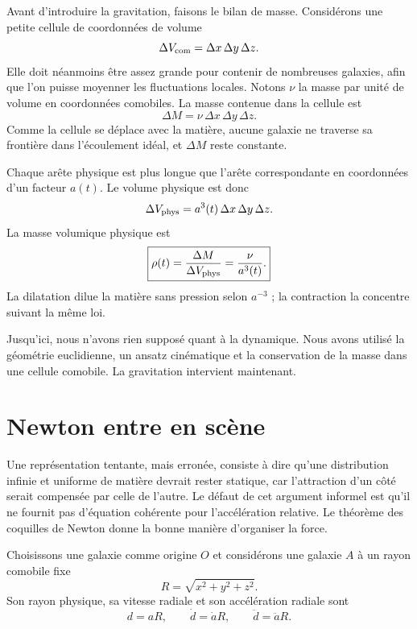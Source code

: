 Avant d’introduire la gravitation, faisons le bilan de masse. Considérons une petite cellule de coordonnées de volume
\begin{equation}
\Delta V_{\rm com}=\Delta x\,\Delta y\,\Delta z.
\end{equation}
Elle doit néanmoins être assez grande pour contenir de nombreuses galaxies, afin que l’on puisse moyenner les fluctuations locales. Notons \(\nu\) la masse par unité de volume en coordonnées comobiles. La masse contenue dans la cellule est
\begin{equation}
\Delta M=\nu\,\Delta x\,\Delta y\,\Delta z.
\label{eq:c01-comoving-mass}
\end{equation}
Comme la cellule se déplace avec la matière, aucune galaxie ne traverse sa frontière dans l’écoulement idéal, et \(\Delta M\) reste constante.

Chaque arête physique est plus longue que l’arête correspondante en coordonnées d’un facteur \(a(t)\). Le volume physique est donc
\begin{equation}
\Delta V_{\rm phys}=a^3(t)\,\Delta x\,\Delta y\,\Delta z.
\end{equation}
La masse volumique physique est
\begin{equation}
\boxed{\rho(t)=\frac{\Delta M}{\Delta V_{\rm phys}}=\frac{\nu}{a^3(t)}.}
\label{eq:c01-density-dilution}
\end{equation}
La dilatation dilue la matière sans pression selon \(a^{-3}\) ; la contraction la concentre suivant la même loi.

Jusqu’ici, nous n’avons rien supposé quant à la dynamique. Nous avons utilisé la géométrie euclidienne, un ansatz cinématique et la conservation de la masse dans une cellule comobile. La gravitation intervient maintenant.

\section{Newton entre en scène}

Une représentation tentante, mais erronée, consiste à dire qu’une distribution infinie et uniforme de matière devrait rester statique, car l’attraction d’un côté serait compensée par celle de l’autre. Le défaut de cet argument informel est qu’il ne fournit pas d’équation cohérente pour l’accélération relative. Le théorème des coquilles de Newton donne la bonne manière d’organiser la force.

Choisissons une galaxie comme origine \(O\) et considérons une galaxie \(A\) à un rayon comobile fixe
\begin{equation}
R=\sqrt{x^2+y^2+z^2}.
\end{equation}
Son rayon physique, sa vitesse radiale et son accélération radiale sont
\begin{equation}
d=aR,
\qquad
\dot d=\dot a R,
\qquad
\ddot d=\ddot a R.
\label{eq:c01-radial-kinematics}
\end{equation}

